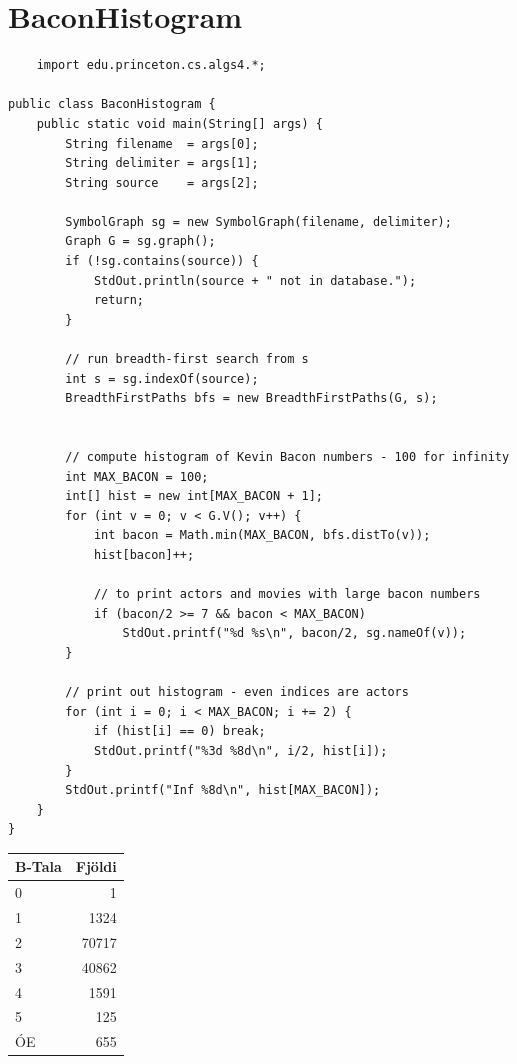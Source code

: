 \documentclass{article}
\begin{document}
\newpage
\section*{BaconHistogram}
\begin{lstlisting}
    import edu.princeton.cs.algs4.*;

public class BaconHistogram {
    public static void main(String[] args) {
        String filename  = args[0];
        String delimiter = args[1];
        String source    = args[2];

        SymbolGraph sg = new SymbolGraph(filename, delimiter);
        Graph G = sg.graph();
        if (!sg.contains(source)) {
            StdOut.println(source + " not in database.");
            return;
        }

        // run breadth-first search from s
        int s = sg.indexOf(source);
        BreadthFirstPaths bfs = new BreadthFirstPaths(G, s);


        // compute histogram of Kevin Bacon numbers - 100 for infinity
        int MAX_BACON = 100;
        int[] hist = new int[MAX_BACON + 1];
        for (int v = 0; v < G.V(); v++) {
            int bacon = Math.min(MAX_BACON, bfs.distTo(v));
            hist[bacon]++;

            // to print actors and movies with large bacon numbers
            if (bacon/2 >= 7 && bacon < MAX_BACON)
                StdOut.printf("%d %s\n", bacon/2, sg.nameOf(v));
        }

        // print out histogram - even indices are actors
        for (int i = 0; i < MAX_BACON; i += 2) {
            if (hist[i] == 0) break;
            StdOut.printf("%3d %8d\n", i/2, hist[i]);
        }
        StdOut.printf("Inf %8d\n", hist[MAX_BACON]);
    }
}
\end{lstlisting}

\begin{tabular}{|l|r|}
    \hline
    B-Tala  &Fjöldi \\
    \hline
    0       &1      \\
    \hline
    1       &1324   \\
    \hline
    2       &70717  \\
    \hline
    3       &40862  \\
    \hline
    4       &1591   \\
    \hline
    5       &125    \\
    \hline
    ÓE      &655    \\
    \hline
\end{tabular}
\end{document}
